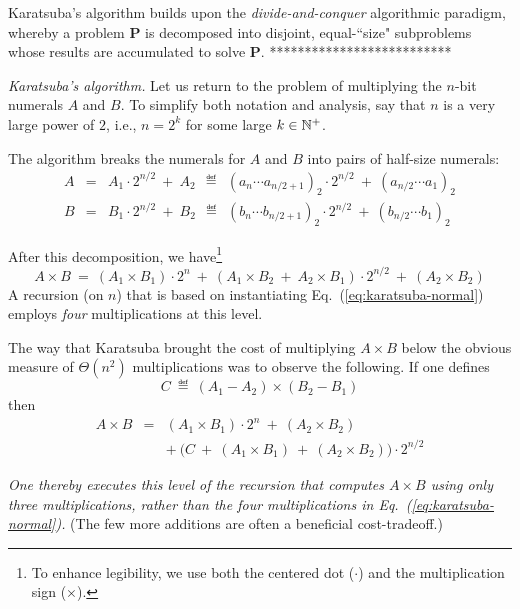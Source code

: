 \begin{itemize}
{\medskip

Karatsuba's algorithm builds upon the {\it divide-and-conquer} algorithmic paradigm, whereby a
problem {\bf P} is decomposed into disjoint, equal-``size" subproblems whose results are accumulated to solve {\bf P}.
**************************}


\textit{Karatsuba's algorithm.}
Let us return to the problem of multiplying the $n$-bit numerals $A$ and $B$.  To simplify both notation and analysis, say that $n$ is a very large power of $2$, i.e., $n=2^k$ for some large $k \in \mathbb{N}^+$.

\smallskip

The algorithm breaks the numerals for $A$ and $B$ into pairs of half-size numerals:
\begin{eqnarray*}
A & = & A_1 \cdot 2^{n/2} \ + \ A_2 \ \ 
 \eqdef  \ \ (a_n \cdots a_{n/2+1})_2 \cdot 2^{n/2} \ + \ (a_{n/2} \cdots a_1)_2 \\
B & = & B_1 \cdot 2^{n/2} \ + \  B_2 \ \
  \eqdef  \ \ (b_n \cdots b_{n/2+1})_2 \cdot 2^{n/2} \ + \ (b_{n/2} \cdots b_1)_2
\end{eqnarray*}

After this decomposition, we have\footnote{To enhance legibility, we use both the centered dot ($\cdot$) and the multiplication sign ($\times$).}
\begin{equation}
\label{eq:karatsuba-normal}
A \times B \ = \ (A_1 \times B_1) \cdot 2^n \ + \  (A_1 \times B_2 \ + \ A_2 \times B_1) \cdot 2^{n/2} \ + \ (A_2 \times B_2)
\end{equation}
A recursion (on $n$) that is based on instantiating Eq.~(\ref{eq:karatsuba-normal}) employs {\em four} multiplications at this level.

\smallskip

The way that Karatsuba brought the cost of multiplying $A \times B$ below the obvious measure of $\Theta(n^2)$ multiplications was to observe the following.  If one defines
\[ C \ \eqdef \ (A_1 - A_2) \times (B_2 - B_1) \]
then
\begin{eqnarray*}
A \times B & = & (A_1 \times B_1) \cdot 2^n \ + \ (A_2 \times B_2) \\
                 &    & + \ \big(C \ + \ (A_1 \times B_1) \ + \ (A_2 \times B_2) \big) \cdot 2^{n/2}
\end{eqnarray*}

{\em One thereby executes this level of the recursion that computes $A \times B$ using only {\em three} multiplications, rather than the four multiplications in Eq.~(\ref{eq:karatsuba-normal}).}  (The few more additions are often a beneficial cost-tradeoff.)


\end{itemize}
